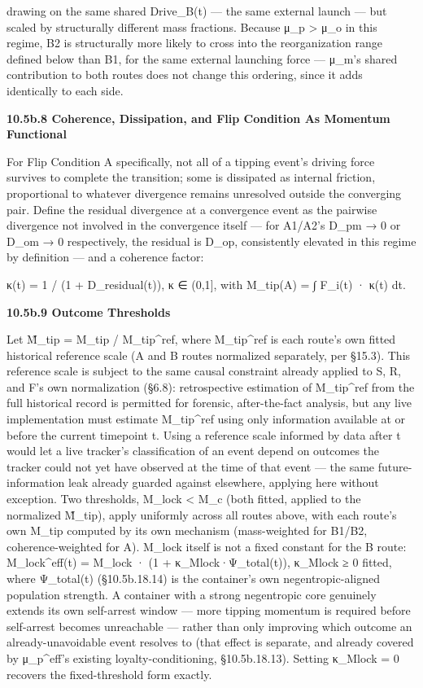 \documentclass[
]{article}
\begin{document}
drawing on the same shared Drive\_B(t) --- the same external launch ---
but scaled by structurally different mass fractions. Because μ\_p
\textgreater{} μ\_o in this regime, B2 is structurally more likely to
cross into the reorganization range defined below than B1, for the same
external launching force --- μ\_m's shared contribution to both routes
does not change this ordering, since it adds identically to each side.

\textbf{10.5b.8 Coherence, Dissipation, and Flip Condition As Momentum
Functional}

For Flip Condition A specifically, not all of a tipping event's driving
force survives to complete the transition; some is dissipated as
internal friction, proportional to whatever divergence remains
unresolved outside the converging pair. Define the residual divergence
at a convergence event as the pairwise divergence not involved in the
convergence itself --- for A1/A2's D\_pm → 0 or D\_om → 0 respectively,
the residual is D\_op, consistently elevated in this regime by
definition --- and a coherence factor:

κ(t) = 1 / (1 + D\_residual(t)), κ ∈ (0,1{]}, with M\_tip(A) = ∫ F\_i(t)
· κ(t) dt.

\textbf{10.5b.9 Outcome Thresholds}

Let M̃\_tip = M\_tip / M\_tip\^{}ref, where M\_tip\^{}ref is each route's
own fitted historical reference scale (A and B routes normalized
separately, per §15.3). This reference scale is subject to the same
causal constraint already applied to S, R, and F's own normalization
(§6.8): retrospective estimation of M\_tip\^{}ref from the full
historical record is permitted for forensic, after-the-fact analysis,
but any live implementation must estimate M\_tip\^{}ref using only
information available at or before the current timepoint t. Using a
reference scale informed by data after t would let a live tracker's
classification of an event depend on outcomes the tracker could not yet
have observed at the time of that event --- the same future-information
leak already guarded against elsewhere, applying here without exception.
Two thresholds, M\_lock \textless{} M\_c (both fitted, applied to the
normalized M̃\_tip), apply uniformly across all routes above, with each
route's own M\_tip computed by its own mechanism (mass-weighted for
B1/B2, coherence-weighted for A). M\_lock itself is not a fixed constant
for the B route: M\_lock\^{}eff(t) = M\_lock · (1 +
κ\_Mlock·Ψ\_total(t)), κ\_Mlock ≥ 0 fitted, where Ψ\_total(t)
(§10.5b.18.14) is the container's own negentropic-aligned population
strength. A container with a strong negentropic core genuinely extends
its own self-arrest window --- more tipping momentum is required before
self-arrest becomes unreachable --- rather than only improving which
outcome an already-unavoidable event resolves to (that effect is
separate, and already covered by μ\_p\^{}eff's existing
loyalty-conditioning, §10.5b.18.13). Setting κ\_Mlock = 0 recovers the
fixed-threshold form exactly.
\end{document}
